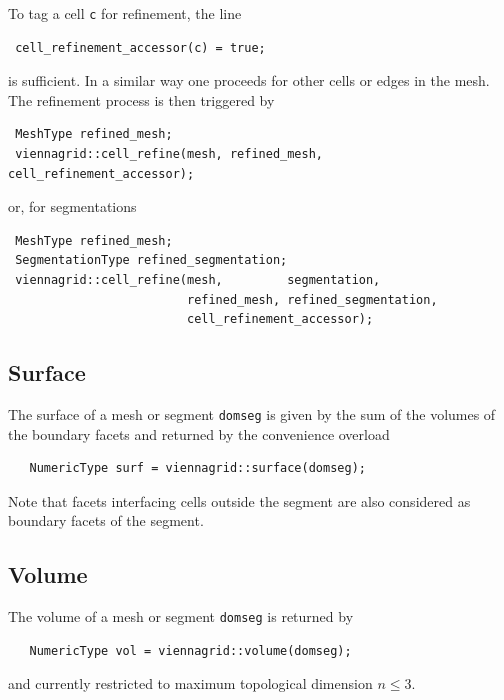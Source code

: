  To tag a cell \lstinline|c| for refinement, the line
 \begin{lstlisting}
 cell_refinement_accessor(c) = true;
 \end{lstlisting}
 is sufficient. In a similar way one proceeds for other cells or edges in the mesh. The refinement process is then triggered by
 \begin{lstlisting}
 MeshType refined_mesh;
 viennagrid::cell_refine(mesh, refined_mesh, cell_refinement_accessor);
 \end{lstlisting}

 \pagebreak

 or, for segmentations
 \begin{lstlisting}
 MeshType refined_mesh;
 SegmentationType refined_segmentation;
 viennagrid::cell_refine(mesh,         segmentation,
                         refined_mesh, refined_segmentation,
                         cell_refinement_accessor);
 \end{lstlisting}


 \subsection{Surface}
 The surface of a mesh or segment \lstinline|domseg| is given by the sum of the volumes of the boundary facets and returned by the convenience overload
  \begin{lstlisting}
   NumericType surf = viennagrid::surface(domseg);
  \end{lstlisting}
  Note that facets interfacing cells outside the segment are also considered as boundary facets of the segment.


  \subsection{Volume}
  The volume of a mesh or segment \lstinline|domseg| is returned by
  \begin{lstlisting}
   NumericType vol = viennagrid::volume(domseg);
  \end{lstlisting}
  and currently restricted to maximum topological dimension $n \leq 3$.



